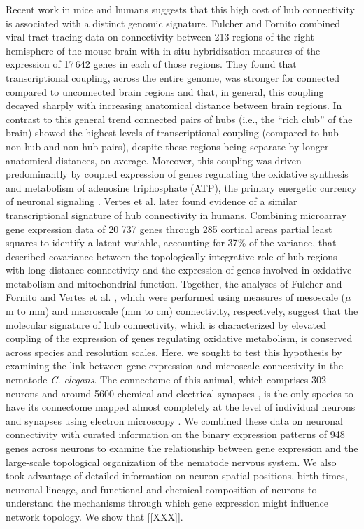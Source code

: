 \documentclass[10pt,letterpaper]{article}
\begin{document}
Recent work in mice and humans suggests that this high cost of hub connectivity is associated with a distinct genomic signature.
Fulcher and Fornito \cite{Fulcher:2016ck} combined viral tract tracing data on connectivity between 213 regions of the right hemisphere of the mouse brain \cite{Oh2014} with in situ hybridization measures of the expression of 17\,642 genes in each of those regions.
They found that transcriptional coupling, across the entire genome, was stronger for connected compared to unconnected brain regions and that, in general, this coupling decayed sharply with increasing anatomical distance between brain regions.
In contrast to this general trend connected pairs of hubs (i.e., the ``rich club'' of the brain) showed the highest levels of transcriptional coupling (compared to hub-non-hub and non-hub pairs), despite these regions being separate by longer anatomical distances, on average.
Moreover, this coupling was driven predominantly by coupled expression of genes regulating the oxidative synthesis and metabolism of adenosine triphosphate (ATP), the primary energetic currency of neuronal signaling \cite{Lennie:2003ia, Laughlin:2003vu}.
Vertes et al. \cite{Vertes2016a} later found evidence of a similar transcriptional signature of hub connectivity in humans.
Combining microarray gene expression data of 20 737 genes through 285 cortical areas partial least squares to identify a latent variable, accounting for 37$\%$ of the variance, that described covariance between the topologically integrative role of hub regions with long-distance connectivity and the expression of genes involved in oxidative metabolism and mitochondrial function.
Together, the analyses of Fulcher and Fornito \cite{Fulcher:2016ck} and Vertes et al. \cite{Vertes2016a}, which were performed using measures of mesoscale ($\mu$m to mm) and macroscale (mm to cm) connectivity, respectively, suggest that the molecular signature of hub connectivity, which is characterized by elevated coupling of the expression of genes regulating oxidative metabolism, is conserved across species and resolution scales.
Here, we sought to test this hypothesis by examining the link between gene expression and microscale connectivity in the nematode \emph{C. elegans}.
The connectome of this animal, which comprises 302 neurons and around 5600 chemical and electrical synapses \cite{White:1986tx}, is the only species to have its connectome mapped almost completely at the level of individual neurons and synapses using electron microscopy \cite{White:1986tx, Varshney2011}.
We combined these data on neuronal connectivity with curated information on the binary expression patterns of 948 genes across neurons to examine the relationship between gene expression and the large-scale topological organization of the nematode nervous system.
We also took advantage of detailed information on neuron spatial positions, birth times, neuronal lineage, and functional and chemical composition of neurons to understand the mechanisms through which gene expression might influence network topology.
We show that [[XXX]].
\end{document}
